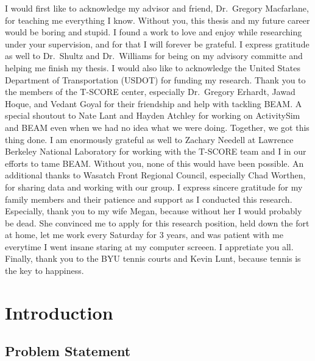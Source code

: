 \documentclass[fancy, masters]{byuthesis}
\begin{document}
    \begin{acknowledgments}
  I would first like to acknowledge my advisor and friend, Dr.~Gregory Macfarlane, for teaching me everything I know. Without you, this thesis and my future career would be boring and stupid. I found a work to love and enjoy while researching under your supervision, and for that I will forever be grateful. I express gratitude as well to Dr.~Shultz and Dr.~Williams for being on my advisory committe and helping me finish my thesis. I would also like to acknowledge the United States Department of Transportation (USDOT) for funding my research. Thank you to the members of the T-SCORE center, especially Dr.~Gregory Erhardt, Jawad Hoque, and Vedant Goyal for their friendship and help with tackling BEAM. A special shoutout to Nate Lant and Hayden Atchley for working on ActivitySim and BEAM even when we had no idea what we were doing. Together, we got this thing done. I am enormously grateful as well to Zachary Needell at Lawrence Berkeley National Laboratory for working with the T-SCORE team and I in our efforts to tame BEAM. Without you, none of this would have been possible. An additional thanks to Wasatch Front Regional Council, especially Chad Worthen, for sharing data and working with our group. I express sincere gratitude for my family members and their patience and support as I conducted this research. Especially, thank you to my wife Megan, because without her I would probably be dead. She convinced me to apply for this research position, held down the fort at home, let me work every Saturday for 3 years, and was patient with me everytime I went insane staring at my computer screeen. I appretiate you all. Finally, thank you to the BYU tennis courts and Kevin Lunt, because tennis is the key to happiness.
  \end{acknowledgments}
  	\clearpage

	\tableofcontents*
	\clearpage

	\listoffigures
	\clearpage

	\listoftables
	\clearpage

	
	\clearpage

	\mainmatter

\hypertarget{intro}{%
\chapter{Introduction}\label{intro}}

\hypertarget{problem-statement}{%
\section{Problem Statement}\label{problem-statement}}
\end{document}
